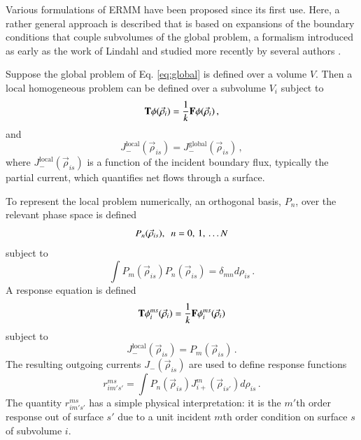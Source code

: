 Various formulations of ERMM have been proposed since
its first use.  Here, 
a rather general approach is described that is
based on expansions of the boundary 
conditions that couple
subvolumes of the global problem, a formalism introduced 
as early as the work of Lindahl \cite{lindahl1976mdr} and
studied more recently by several authors
\cite{mosher2006ifr, roberts2011ser, roberts2012ksi}.

Suppose the global problem 
of Eq. \ref{eq:global} is defined over a 
volume $V$.  Then a local homogeneous problem can be defined over a 
subvolume $V_i$ subject to 
\begin{equation}
  \mathbf{T} \phi(\vec{\rho}_i) = 
    \frac{1}{k} \mathbf{F} \phi(\vec{\rho}_i) \, ,
  \label{eq:local}
\end{equation}
and
\begin{equation}
  J^{\mathrm{local}}_{-} (\vec{\rho}_{is}) = 
    J^{\mathrm{global}}_{-}(\vec{\rho}_{is}) \, ,
  \label{eq:localbc}
\end{equation}   
where $J^{\mathrm{local}}_{-} (\vec{\rho}_{is}) $ is a 
function of the incident boundary flux, typically the 
partial current, which quantifies net flows through a 
surface.

To represent the local problem numerically, an orthogonal basis, $P_n$,
over the relevant phase space is defined
\begin{equation}
  P_n(\vec{\rho}_{is}), \,\,\, n = 0, \, 1, \, \ldots N  \\
\end{equation}
subject to
\begin{equation}
   \int P_m(\vec{\rho}_{is}) P_n(\vec{\rho}_{is}) 
     = \delta_{mn} d\rho_{is} \, .
\end{equation}
A response equation is defined 
\begin{equation}
 \mathbf{T} \phi_{i}^{ms} (\vec{\rho}_i) = 
   \frac{1}{k} \mathbf{F} \phi_{i}^{ms} (\vec{\rho}_i) 
\end{equation}
subject to
\begin{equation}
 J^{\mathrm{local}}_{-} (\vec{\rho}_{is}) = P_m(\vec{\rho}_{is}) \, .
\end{equation}
The resulting outgoing currents $J_{-} (\vec{\rho}_{is}) $ are used to define
response functions
\begin{equation}
       r^{ms}_{im's'} = \int  P_n(\vec{\rho}_{is})  
        J_{i+}^{m} (\vec{\rho}_{is'}) d\rho_{is} \, .
\label{eq:responsefunction}
\end{equation}
The quantity $r^{ms}_{im's'}$ has a simple physical
interpretation: it is the $m'$th order response 
out of surface $s'$ due to a unit incident $m$th order condition on 
surface $s$ of subvolume $i$. 

